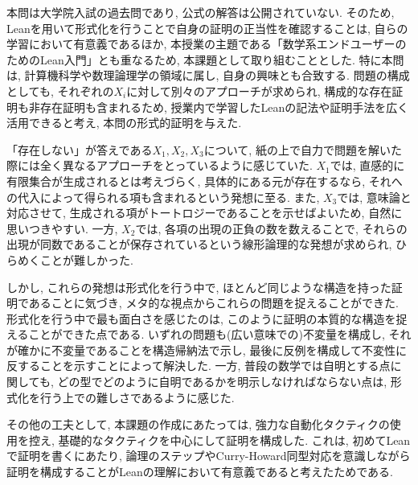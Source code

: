 \documentclass{jsarticle}
\begin{document}
本問は大学院入試の過去問であり, 公式の解答は公開されていない.
そのため, Leanを用いて形式化を行うことで自身の証明の正当性を確認することは, 自らの学習において有意義であるほか, 本授業の主題である「数学系エンドユーザーのためのLean入門」とも重なるため, 本課題として取り組むこととした.
特に本問は, 計算機科学や数理論理学の領域に属し, 自身の興味とも合致する.
問題の構成としても, それぞれの$X_{i}$に対して別々のアプローチが求められ, 構成的な存在証明も非存在証明も含まれるため, 授業内で学習したLeanの記法や証明手法を広く活用できると考え, 本問の形式的証明を与えた.

「存在しない」が答えである$X_{1}, X_{2}, X_{3}$について, 紙の上で自力で問題を解いた際には全く異なるアプローチをとっているように感じていた.
$X_{1}$では, 直感的に有限集合が生成されるとは考えづらく, 具体的にある元が存在するなら, それへの代入によって得られる項も含まれるという発想に至る.
また, $X_{3}$では, 意味論と対応させて, 生成される項がトートロジーであることを示せばよいため, 自然に思いつきやすい.
一方, $X_{2}$では, 各項の出現の正負の数を数えることで, それらの出現が同数であることが保存されているという線形論理的な発想が求められ, ひらめくことが難しかった.

しかし, これらの発想は形式化を行う中で, ほとんど同じような構造を持った証明であることに気づき, メタ的な視点からこれらの問題を捉えることができた.
形式化を行う中で最も面白さを感じたのは, このように証明の本質的な構造を捉えることができた点である.
いずれの問題も(広い意味での)不変量を構成し, それが確かに不変量であることを構造帰納法で示し, 最後に反例を構成して不変性に反することを示すことによって解決した.
一方, 普段の数学では自明とする点に関しても, どの型でどのように自明であるかを明示しなければならない点は, 形式化を行う上での難しさであるように感じた.

その他の工夫として, 本課題の作成にあたっては, 強力な自動化タクティクの使用を控え, 基礎的なタクティクを中心にして証明を構成した.
これは, 初めてLeanで証明を書くにあたり, 論理のステップやCurry-Howard同型対応を意識しながら証明を構成することがLeanの理解において有意義であると考えたためである.
\end{document}

